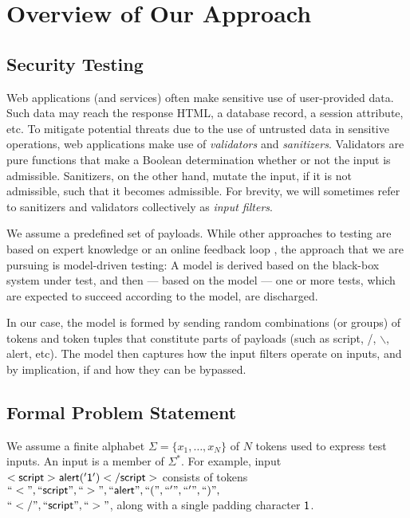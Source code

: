 \section{Overview of Our Approach}

\subsection{Security Testing}

Web applications (and services) often make sensitive use of user-provided data. Such data may reach the response HTML, a database record, a session attribute, etc. To mitigate potential threats due to the use of untrusted data in sensitive operations, web applications make use of \emph{validators} and \emph{sanitizers}. Validators are pure functions that make a Boolean determination whether or not the input is admissible. Sanitizers, on the other hand, mutate the input, if it is not admissible, such that it becomes admissible. For brevity, we will sometimes refer to sanitizers and validators collectively as \emph{input filters}.

We assume a predefined set of payloads. While other approaches to testing are based on expert knowledge \cite{AppScan} or an online feedback loop \cite{TrippIssta:2013}, the approach that we are pursuing is model-driven testing: A model is derived based on the black-box system under test, and then --- based on the model --- one or more tests, which are expected to succeed according to the model, are discharged.

In our case, the model is formed by sending random combinations (or groups) of tokens and token tuples that constitute parts of payloads (such as {\sf script}, {\sf /}, {\sf $\backslash$}, {\sf alert}, etc). The model then captures how the input filters operate on inputs, and by implication, if and how they can be bypassed.

\subsection{Formal Problem Statement}

We assume a finite alphabet $\Sigma=\{x_1,\ldots,x_N\}$ of $N$ tokens used to express test inputs. An input is a member of $\Sigma^{*}$. For example, input ${\sf <script>alert('1')</script>}$ consists of tokens ${\sf ``<",``script",``>",``alert",``(",``'",``'",``)",}$\\$\sf{``</",``script",``>"}$, along with a single  padding character $\sf{1}$.

